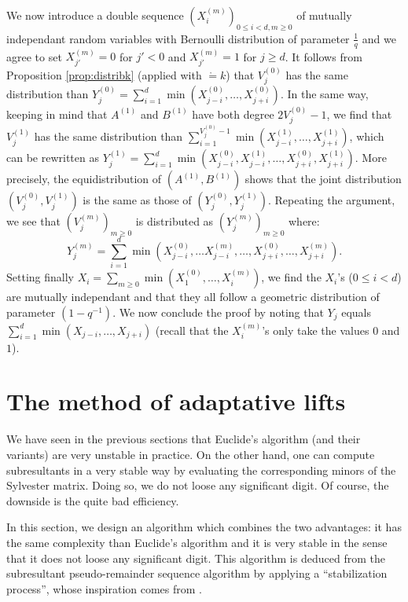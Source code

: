 \documentclass{article}
\begin{document}
We now introduce a double sequence $(X_i^{(m)})_{0 \leq i < d, m 
\geq 0}$ of mutually independant random variables with Bernoulli
distribution of parameter $\frac 1 q$ and we agree to set 
$X_{j'}^{(m)} = 0$ for $j' < 0$ and $X_{j'}^{(m)} = 1$ for $j \geq d$.
It follows from Proposition \ref{prop:distribk} (applied with $\ring = 
k$) that $V_j^{(0)}$ has the same distribution than 
$Y_j^{(0)} = \sum_{i=1}^d \min(X_{j-i}^{(0)}, \ldots, X_{j+i}^{(0)})$.
In the same way, keeping in mind that $A^{(1)}$ and $B^{(1)}$ have both 
degree $2V_j^{(0)} - 1$, we find that $V_j^{(1)}$ has the same 
distribution than $\sum_{i=1}^{V_j^{(0)} - 1} \min(X_{j-i}^{(1)}, 
\ldots, X_{j+i}^{(1)})$, which can be rewritten as
$Y_j^{(1)} = \sum_{i=1}^d \min(X_{j-i}^{(0)}, X_{j-i}^{(1)}, \ldots, 
X_{j+i}^{(0)}, X_{j+i}^{(1)})$. More precisely,
the equidistribution of $(A^{(1)}, B^{(1)})$ shows that the 
joint distribution $(V_j^{(0)}, V_j^{(1)})$ is the same as those
of $(Y_j^{(0)}, Y_j^{(1)})$. Repeating the argument, we see that
$(V_j^{(m)})_{m \geq 0}$ is distributed as $(Y_j^{(m)})_{m \geq 0}$
where:
$$Y_j^{(m)} = \sum_{i=1}^d \min(X_{j-i}^{(0)}, \ldots X_{j-i}^{(m)}, 
\ldots, X_{j+i}^{(0)}, \ldots, X_{j+i}^{(m)}).$$
Setting finally $X_i = \sum_{m \geq 0} \min(X_1^{(0)}, \ldots, 
X_i^{(m)})$, we find the $X_i$'s ($0 \leq i < d$) are mutually 
independant and that they all follow a geometric distribution of 
parameter $(1 - q^{-1})$. We now conclude the proof by noting that 
$Y_j$ equals $\sum_{i=1}^d \min(X_{j-i}, \ldots, X_{j+i})$ (recall
that the $X_i^{(m)}$'s only take the values $0$ and $1$).

\section{The method of adaptative lifts}
\label{sec:stable}

We have seen in the previous sections that Euclide's algorithm (and 
their variants) are very unstable in practice. On the other hand, 
one can compute subresultants in a very stable way by evaluating
the corresponding minors of the Sylvester matrix. Doing so, we do
not loose any significant digit. Of course, the downside is the
quite bad efficiency.

In this section, we design an algorithm which combines the two
advantages: it has the same complexity than Euclide's algorithm
and it is very stable in the sense that it does not loose any
significant digit. 
This algorithm is deduced from the subresultant pseudo-remainder
sequence algorithm by applying a ``stabilization process'', whose 
inspiration comes from \cite{padicprec}.
\end{document}
